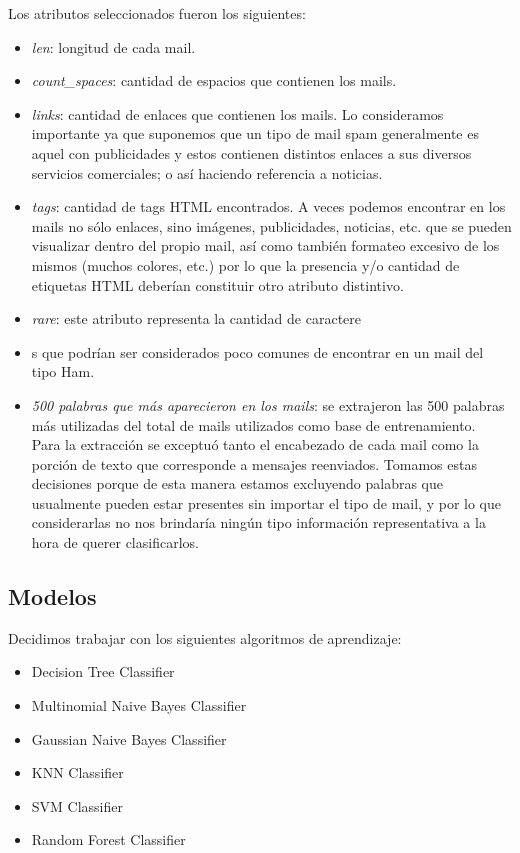\documentclass[a4paper]{article}
\newcounter{col}
\begin{document}
Los atributos seleccionados fueron los siguientes:
\begin{itemize}
\item \textit{len}: longitud de cada mail.
\item \textit{count\_spaces}: cantidad de espacios que contienen los mails.
\item \textit{links}: cantidad de enlaces que contienen los mails. Lo consideramos importante ya que suponemos que un tipo de mail spam generalmente es aquel con publicidades y estos contienen distintos enlaces a sus diversos servicios comerciales; o así haciendo referencia a noticias.
\item \textit{tags}: cantidad de tags HTML encontrados. A veces podemos encontrar en los mails no sólo enlaces, sino imágenes, publicidades, noticias, etc. que se pueden visualizar dentro del propio mail, así como también formateo excesivo de los mismos (muchos colores, etc.) por lo que la presencia y/o cantidad de etiquetas HTML deberían constituir otro atributo distintivo.
\item \textit{rare}: este atributo representa la cantidad de caractere
\item 
s que podrían ser considerados poco comunes de encontrar en un mail del tipo Ham.
\item \textit{500 palabras que más aparecieron en los mails}: se extrajeron las 500 palabras más utilizadas del total de mails utilizados como base de entrenamiento. \\
Para la extracción se exceptuó tanto el encabezado de cada mail como la porción de texto que corresponde a mensajes reenviados. Tomamos estas decisiones porque de esta manera estamos excluyendo palabras que usualmente pueden estar presentes sin importar el tipo de mail, y por lo que considerarlas no nos brindaría ningún tipo información representativa a la hora de querer clasificarlos.     
\end{itemize}

\subsection{Modelos}
Decidimos trabajar con los siguientes algoritmos de aprendizaje:

\begin{itemize}
	\item Decision Tree Classifier
	\item Multinomial Naive Bayes Classifier
	\item Gaussian Naive Bayes Classifier
	\item KNN Classifier
	\item SVM Classifier
	\item Random Forest Classifier
\end{itemize}
\end{document}
